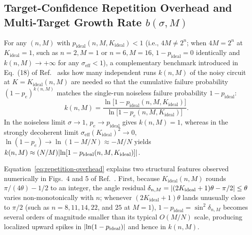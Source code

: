 \subsection{Target-Confidence Repetition Overhead and Multi-Target Growth Rate \texorpdfstring{$b(\sigma, M)$}{b(sigma, M)}}
\label{sec:repetition-overhead}

For any $(n, M)$ with $p_{\mathrm{ideal}}(n, M, K_{\mathrm{ideal}}) < 1$ (i.e., $4M \ne 2^n$; when $4M = 2^n$ at $K_{\mathrm{ideal}} = 1$, such as $n = 2, M = 1$ or $n = 6, M = 16$, $1 - p_{\mathrm{ideal}} = 0$ identically and $k(n, M) \to +\infty$ for any $\sigma_{\mathrm{eff}} < 1$), a complementary benchmark introduced in Eq.~(18) of Ref.~\cite{SahaRoyLacalle2026} asks how many independent runs $k(n, M)$ of the noisy circuit at $K = K_{\mathrm{ideal}}(n, M)$ are needed so that the cumulative failure probability $(1 - p_e)^{k(n,M)}$ matches the single-run noiseless failure probability $1 - p_{\mathrm{ideal}}$:
\begin{equation}
k(n, M) = \frac{\ln\bigl[1 - p_{\mathrm{ideal}}(n, M, K_{\mathrm{ideal}})\bigr]}{\ln\bigl[1 - p_e(n, M, K_{\mathrm{ideal}})\bigr]}.
\label{eq:repetition-overhead}
\end{equation}
In the noiseless limit $\sigma \to 1$, $p_e \to p_{\mathrm{ideal}}$ gives $k(n, M) = 1$, whereas in the strongly decoherent limit $\sigma_{\mathrm{eff}}(K_{\mathrm{ideal}})^2 \to 0$, $\ln(1 - p_e) \to \ln(1 - M/N) \approx -M/N$ yields $k(n, M) \approx (N/M)\lvert\ln[1 - p_{\mathrm{ideal}}(n, M, K_{\mathrm{ideal}})]\rvert$.

Equation~\eqref{eq:repetition-overhead} explains two structural features observed numerically in Figs.~4 and 5 of Ref.~\cite{SahaRoyLacalle2026}. First, because $K_{\mathrm{ideal}}(n, M)$ rounds $\pi/(4\theta) - 1/2$ to an integer, the angle residual $\delta_{n,M} = \lvert(2K_{\mathrm{ideal}} + 1)\theta - \pi/2\rvert \le \theta$ varies non-monotonically with $n$; whenever $(2K_{\mathrm{ideal}} + 1)\theta$ lands unusually close to $\pi/2$ (such as $n = 8, 11, 14, 22$, and $25$ at $M = 1$), $1 - p_{\mathrm{ideal}} = \sin^2\delta_{n,M}$ becomes several orders of magnitude smaller than its typical $O(M/N)$ scale, producing localized upward spikes in $\lvert\ln(1 - p_{\mathrm{ideal}})\rvert$ and hence in $k(n, M)$.

